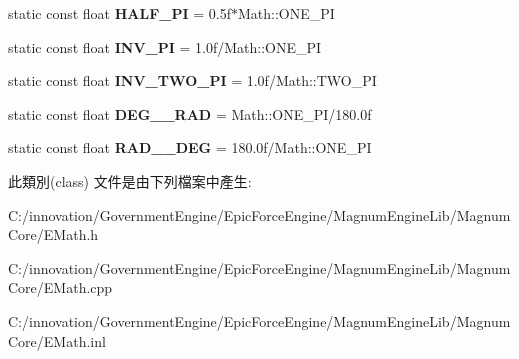 \begin{DoxyCompactItemize}
\item 
static const float {\bfseries H\+A\+L\+F\+\_\+\+PI} = 0.\+5f$\ast$\+Math\+::\+O\+N\+E\+\_\+\+PI\hypertarget{class_i_dream_sky_1_1_math_a6475d0f7b5d131ca9bacd916606bf295}{}\label{class_i_dream_sky_1_1_math_a6475d0f7b5d131ca9bacd916606bf295}

\item 
static const float {\bfseries I\+N\+V\+\_\+\+PI} = 1.\+0f/\+Math\+::\+O\+N\+E\+\_\+\+PI\hypertarget{class_i_dream_sky_1_1_math_a5954722d80833720f554201d313c5d69}{}\label{class_i_dream_sky_1_1_math_a5954722d80833720f554201d313c5d69}

\item 
static const float {\bfseries I\+N\+V\+\_\+\+T\+W\+O\+\_\+\+PI} = 1.\+0f/\+Math\+::\+T\+W\+O\+\_\+\+PI\hypertarget{class_i_dream_sky_1_1_math_adb1ecdad67471d15135877d1992671da}{}\label{class_i_dream_sky_1_1_math_adb1ecdad67471d15135877d1992671da}

\item 
static const float {\bfseries D\+E\+G\+\_\+\_\+\+R\+AD} = Math\+::\+O\+N\+E\+\_\+\+PI/180.\+0f\hypertarget{class_i_dream_sky_1_1_math_ab6311d204c0b5e2548d07ad76939f6cf}{}\label{class_i_dream_sky_1_1_math_ab6311d204c0b5e2548d07ad76939f6cf}

\item 
static const float {\bfseries R\+A\+D\+\_\+\_\+\+D\+EG} = 180.\+0f/\+Math\+::\+O\+N\+E\+\_\+\+PI\hypertarget{class_i_dream_sky_1_1_math_a74da48ccd07882f5407afc9eb02edf23}{}\label{class_i_dream_sky_1_1_math_a74da48ccd07882f5407afc9eb02edf23}

\end{DoxyCompactItemize}


此類別(class) 文件是由下列檔案中產生\+:\begin{DoxyCompactItemize}
\item 
C\+:/innovation/\+Government\+Engine/\+Epic\+Force\+Engine/\+Magnum\+Engine\+Lib/\+Magnum\+Core/E\+Math.\+h\item 
C\+:/innovation/\+Government\+Engine/\+Epic\+Force\+Engine/\+Magnum\+Engine\+Lib/\+Magnum\+Core/E\+Math.\+cpp\item 
C\+:/innovation/\+Government\+Engine/\+Epic\+Force\+Engine/\+Magnum\+Engine\+Lib/\+Magnum\+Core/E\+Math.\+inl\end{DoxyCompactItemize}
